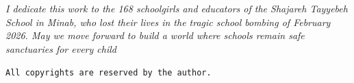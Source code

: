 \cleardoublepage











\begin{titlepage}
\thispagestyle{empty}
\vfill
\begin{center}
\textit{I dedicate this work to the 168 schoolgirls and educators of the Shajareh Tayyebeh School in Minab, who lost their lives in the tragic school bombing of February 2026. May we move forward to build a world where schools remain safe sanctuaries for every child}
\end{center}
\vfill
\end{titlepage}

\cleardoublepage

\begin{titlepage}
\thispagestyle{empty}
\vfill
\begin{center}
\texttt{All copyrights are reserved by the author.}
\end{center}
\vfill
\end{titlepage}

\cleardoublepage